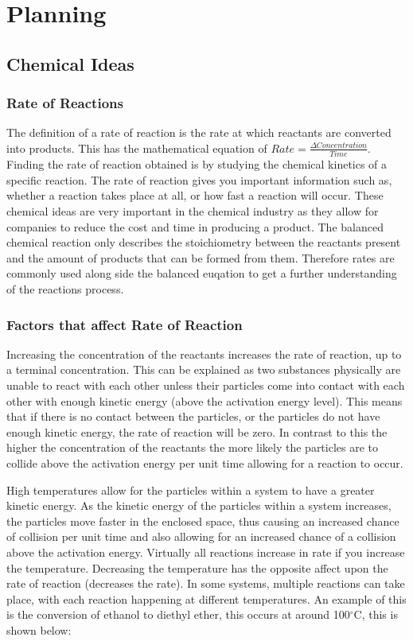 \chapter {Planning}

\section {Chemical Ideas}


	\subsection{Rate of Reactions}

The definition of a rate of reaction is the rate at which reactants are converted into products. This has the mathematical equation of $Rate = \frac{\Delta Concentration}{Time}$. Finding the rate of reaction obtained is by studying the chemical kinetics of a specific reaction. The rate of reaction gives you important information such as, whether a reaction takes place at all, or how fast a reaction will occur. These chemical ideas are very important in the chemical industry as they allow for companies to reduce the cost and time in producing a product. The balanced chemical reaction only describes the stoichiometry between the reactants present and the amount of products that can be formed from them. Therefore rates are commonly used along side the balanced euqation to get a further understanding of the reactions process.

	\subsection{Factors that affect Rate of Reaction}

Increasing the concentration of the reactants increases the rate of reaction, up to a terminal concentration. This can be explained as two substances physically are unable to react with each other unless their particles come into contact with each other with enough kinetic energy (above the activation energy level). This means that if there is no contact between the particles, or the particles do not have enough kinetic energy, the rate of reaction will be zero. In contrast to this the higher the concentration of the reactants the more likely the particles are to collide above the activation energy per unit time allowing for a reaction to occur.

High temperatures allow for the particles within a system to have a greater kinetic energy. As the kinetic energy of the particles within a system increases, the particles move faster in the enclosed space, thus causing an increased chance of collision per unit time and also allowing for an increased chance of a collision above the activation energy. Virtually all reactions increase in rate if you increase the temperature. Decreasing the temperature has the opposite affect upon the rate of reaction (decreases the rate). In some systems, multiple reactions can take place, with each reaction happening at different temperatures. An example of this is the conversion of ethanol to diethyl ether, this occurs at around 100$^{\circ}$C, this is shown below:

